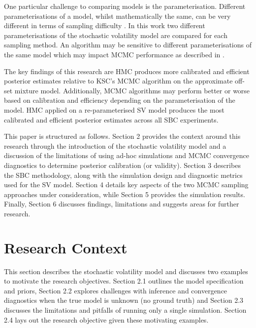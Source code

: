 \documentclass[12pt, a4paper]{article}
\begin{document}
    One particular challenge to comparing models is the parameterisation. Different parameterisations of a model, whilst mathematically the same, can be very different in terms of sampling difficulty \citep{neal2003slice}. In this work two different parameterisations of the stochastic volatility model are compared for each sampling method. An algorithm may be sensitive to different parameterisations of the same model which may impact MCMC performance as described in \citet{strickland2008parameterisation}.
    
    The key findings of this research are HMC produces more calibrated and efficient posterior estimates relative to KSC's MCMC algorithm on the approximate off-set mixture model. Additionally, MCMC algorithms may perform better or worse based on calibration and efficiency depending on the parameterisation of the model. HMC applied on a re-parameterised SV model produces the most calibrated and efficient posterior estimates across all SBC experiments.

    This paper is structured as follows. Section 2 provides the context around this research through the introduction of the stochastic volatility model and a discussion of the limitations of using ad-hoc simulations and MCMC convergence diagnostics to determine posterior calibration (or validity). Section 3 describes the SBC methodology, along with the simulation design and diagnostic metrics used for the SV model. Section 4 details key aspects of the two MCMC sampling approaches under consideration, while Section 5 provides the simulation results. Finally, Section 6 discusses findings, limitations and suggests areas for further research.

\section{Research Context}
This section describes the stochastic volatility model and discusses two examples to motivate the research objectives. Section 2.1 outlines the model specification and priors, Section 2.2 explores challenges with inference and convergence diagnostics when the true model is unknown (no ground truth) and Section 2.3 discusses the limitations and pitfalls of running only a single simulation. Section 2.4 lays out the research objective given these motivating examples.
\end{document}
